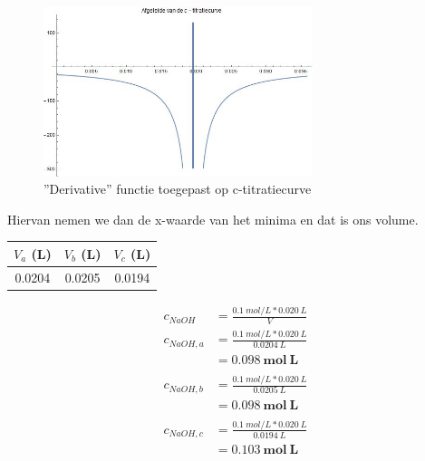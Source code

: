 \documentclass[11pt]{report}
\newcommand{\pbr}{\hfill\break\hfill\break}
\begin{document}
\begin{figure}[H]
    \centering
    \includegraphics[width=0.7\textwidth]{c_derivative.jpg}
    \caption{''Derivative'' functie toegepast op c-titratiecurve}
\end{figure}
Hiervan nemen we dan de x-waarde van het minima en dat is ons volume.\pbr
\begin{tabular}{|c|c|c|}
    \hline
    $V_{a}$ (L) & $V_{b}$ (L) & $V_{c}$ (L) \\\hline
    0.0204 & 0.0205 & 0.0194 \\\hline
\end{tabular}

\begin{equation*}
    \begin{split}
        c_{NaOH} &= \frac{0.1\ mol/L * 0.020\ L}{V}\\
        c_{NaOH,a} &= \frac{0.1\ mol/L * 0.020\ L}{0.0204\ L}\\
            &= \mathbf{0.098\ mol\ L}\\\\
        c_{NaOH,b} &= \frac{0.1\ mol/L * 0.020\ L}{0.0205\ L}\\
            &= \mathbf{0.098\ mol\ L}\\\\
        c_{NaOH,c} &= \frac{0.1\ mol/L * 0.020\ L}{0.0194\ L}\\
            &= \mathbf{0.103\ mol\ L}\\
    \end{split}
\end{equation*}
\end{document}
